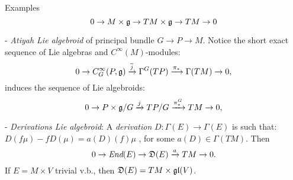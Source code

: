 \begin{frame}{Examples}
    \begin{equation*}
        0 \to M \times \mathfrak{g} \to TM \times \mathfrak{g} \to TM \to 0
    \end{equation*}
    
    - \emph{Atiyah Lie algebroid} of principal bundle $G \to P \to M$. Notice the short exact sequence of Lie algebras and $C^\infty(M)$-modules:
    \begin{equation*}
        0 \to C^\infty_G(P, \mathfrak{g}) \xrightarrow{\overline{j}} \Gamma^G(TP) \xrightarrow{\pi_*} \Gamma(TM) \to 0,
    \end{equation*}
    induces the sequence of Lie algebroids:
    \begin{equation*}
        0 \to P \times \mathfrak{g}/G \xrightarrow{j} TP/G \xrightarrow{\pi_*^G} TM \to 0,
    \end{equation*}
    
    - \emph{Derivations Lie algebroid}: A \emph{derivation} $D: \Gamma(E) \to \Gamma(E)$ is such that:
    $%
        D(f \mu) - f D( \mu) = a(D)(f) \mu
    $%
    , for some $a(D) \in \Gamma(TM)$. Then
    \begin{equation*}
        0 \rightarrow \operatorname{\textit{End}}(E) \rightarrow \mathfrak{D}(E) \xrightarrow{a} TM \rightarrow 0.
    \end{equation*}
    If $E = M \times V$ trivial v.b., then $\mathfrak{D}(E) = TM \times \mathfrak{gl}(V)$.
    
\end{frame}



